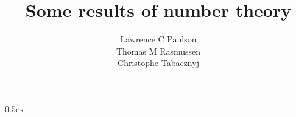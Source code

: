 \documentclass[11pt,a4paper]{article}
\begin{document}
\title{Some results of number theory}
\author{Lawrence C Paulson \\
  Thomas M Rasmussen \\
  Christophe Tabacznyj}
\maketitle

\tableofcontents
\newpage

\parindent 0pt\parskip 0.5ex

\end{document}

